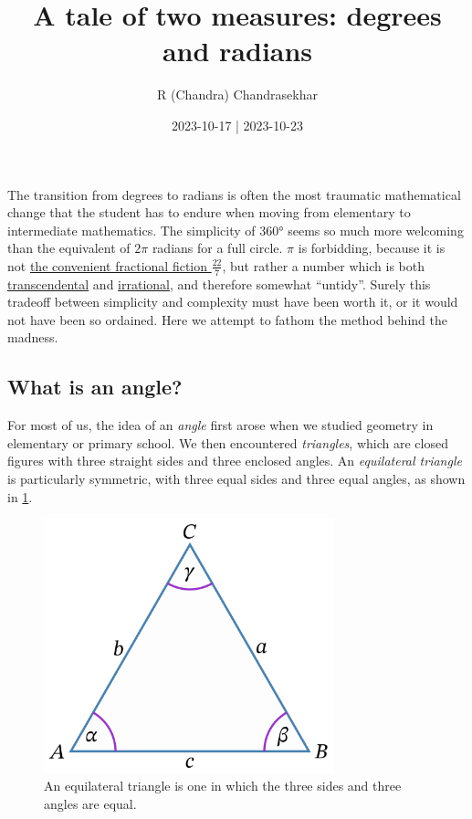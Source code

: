\documentclass[
  a4paper,
]{article}
\title{A tale of two measures: degrees and radians}
\author{R (Chandra) Chandrasekhar}
\date{2023-10-17 | 2023-10-23}
\begin{document}
\maketitle

\thispagestyle{empty}


The transition from degrees to radians is often the most traumatic
mathematical change that the student has to endure when moving from
elementary to intermediate mathematics. The simplicity of 360° seems so
much more welcoming than the equivalent of \(2\pi\) radians for a full
circle. \(\pi\) is forbidding, because it is not
\href{https://en.wikipedia.org/wiki/Proof_that_22/7_exceeds_\%CF\%80}{the
convenient fractional fiction \(\frac{22}{7}\)}, but rather a number
which is both
\href{https://mathworld.wolfram.com/TranscendentalNumber.html}{transcendental}
and \href{https://en.wikipedia.org/wiki/Irrational_number}{irrational},
and therefore somewhat ``untidy''. Surely this tradeoff between
simplicity and complexity must have been worth it, or it would not have
been so ordained. Here we attempt to fathom the method behind the
madness.

\hypertarget{what-is-an-angle}{%
\subsection{What is an angle?}\label{what-is-an-angle}}

For most of us, the idea of an \emph{angle} first arose when we studied
geometry in elementary or primary school. We then encountered
\emph{triangles}, which are closed figures with three straight sides and
three enclosed angles. An \emph{equilateral triangle} is particularly
symmetric, with three equal sides and three equal angles, as shown in
\cref{fig:equilateral}.

\begin{figure}
\hypertarget{fig:equilateral}{%
\centering
\includegraphics[width=0.75\textwidth,height=\textheight]{images/equilateral.png}
\caption{An equilateral triangle is one in which the three sides and
three angles are equal.}\label{fig:equilateral}
}
\end{figure}
\end{document}

